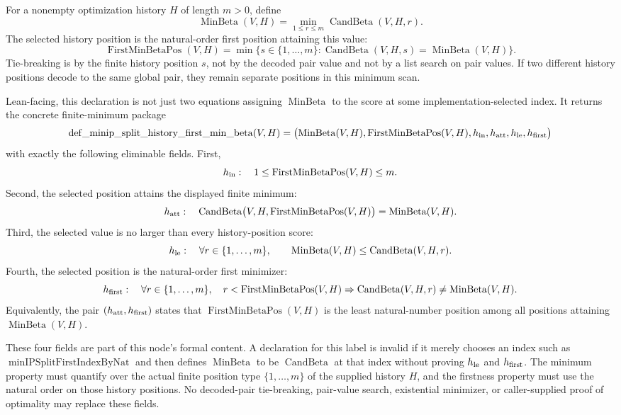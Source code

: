 \begin{definition}
  \label{def:minip-split-history-first-min-beta}
  For a nonempty optimization history $H$ of length $m>0$, define
  \[
    \operatorname{MinBeta}(V,H)
      =
    \min_{1\leq r\leq m}\operatorname{CandBeta}(V,H,r).
  \]
  The selected history position is the natural-order first position attaining
  this value:
  \[
    \operatorname{FirstMinBetaPos}(V,H)
      =
    \min\{s\in\{1,\ldots,m\}:
      \operatorname{CandBeta}(V,H,s)=\operatorname{MinBeta}(V,H)\}.
  \]
  Tie-breaking is by the finite history position $s$, not by the decoded pair
  value and not by a list search on pair values.  If two different history
  positions decode to the same global pair, they remain separate positions in
  this minimum scan.

  Lean-facing, this declaration is not just two equations assigning
  $\operatorname{MinBeta}$ to the score at some implementation-selected index.
  It returns the concrete finite-minimum package
  \[
    \operatorname{def\_minip\_split\_history\_first\_min\_beta}(V,H)
    =
    \bigl(\operatorname{MinBeta}(V,H),
          \operatorname{FirstMinBetaPos}(V,H),
          h_{\rm in},h_{\rm att},h_{\rm le},h_{\rm first}\bigr)
  \]
  with exactly the following eliminable fields.
  First,
  \[
    h_{\rm in}:\quad
    1\leq\operatorname{FirstMinBetaPos}(V,H)\leq m .
  \]
  Second, the selected position attains the displayed finite minimum:
  \[
    h_{\rm att}:\quad
    \operatorname{CandBeta}
      \bigl(V,H,\operatorname{FirstMinBetaPos}(V,H)\bigr)
      =
    \operatorname{MinBeta}(V,H).
  \]
  Third, the selected value is no larger than every history-position score:
  \[
    h_{\rm le}:\quad
    \forall r\in\{1,\ldots,m\},\qquad
      \operatorname{MinBeta}(V,H)
      \leq
      \operatorname{CandBeta}(V,H,r).
  \]
  Fourth, the selected position is the natural-order first minimizer:
  \[
    h_{\rm first}:\quad
    \forall r\in\{1,\ldots,m\},\quad
      r<\operatorname{FirstMinBetaPos}(V,H)
      \Rightarrow
      \operatorname{CandBeta}(V,H,r)
      \neq
      \operatorname{MinBeta}(V,H).
  \]
  Equivalently, the pair $(h_{\rm att},h_{\rm first})$ states that
  $\operatorname{FirstMinBetaPos}(V,H)$ is the least natural-number position
  among all positions attaining $\operatorname{MinBeta}(V,H)$.

  These four fields are part of this node's formal content.  A declaration for
  this label is invalid if it merely chooses an index such as
  $\operatorname{minIPSplitFirstIndexByNat}$ and then defines
  $\operatorname{MinBeta}$ to be
  $\operatorname{CandBeta}$ at that index without proving $h_{\rm le}$ and
  $h_{\rm first}$.  The minimum property must quantify over the actual finite
  position type $\{1,\ldots,m\}$ of the supplied history $H$, and the
  firstness property must use the natural order on those history positions.
  No decoded-pair tie-breaking, pair-value search, existential minimizer, or
  caller-supplied proof of optimality may replace these fields.
\end{definition}

